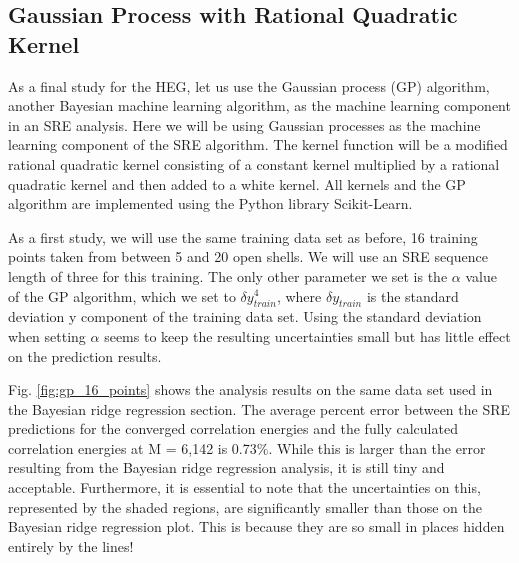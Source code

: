 \subsection*{Gaussian Process with Rational Quadratic Kernel}

As a final study for the HEG, let us use the Gaussian process (GP) algorithm, another Bayesian machine learning algorithm, as the machine learning component in an SRE analysis. Here we will be using Gaussian processes as the machine learning component of the SRE algorithm. The kernel function will be a modified rational quadratic kernel consisting of a constant kernel multiplied by a rational quadratic kernel and then added to a white kernel. All kernels and the GP algorithm are implemented using the Python library Scikit-Learn.  

As a first study, we will use the same training data set as before, 16 training points taken from between 5 and 20 open shells. We will use an SRE sequence length of three for this training. The only other parameter we set is the $\alpha$ value of the GP algorithm, which we set to $\delta y_{train}^4$, where $\delta y_{train}$ is the standard deviation y component of the training data set. Using the standard deviation when setting $\alpha$ seems to keep the resulting uncertainties small but has little effect on the prediction results.

Fig. \ref{fig:gp_16_points} shows the analysis results on the same data set used in the Bayesian ridge regression section. The average percent error between the SRE predictions for the converged correlation energies and the fully calculated correlation energies at M = 6,142 is 0.73$\%$. While this is larger than the error resulting from the Bayesian ridge regression analysis, it is still tiny and acceptable. Furthermore, it is essential to note that the uncertainties on this, represented by the shaded regions, are significantly smaller than those on the Bayesian ridge regression plot. This is because they are so small in places hidden entirely by the lines!

